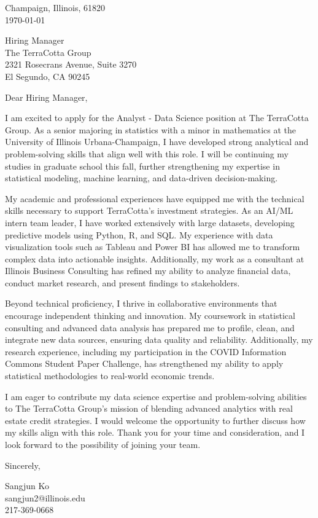 \documentclass[11pt]{article}
\begin{document}
\noindent
Champaign, Illinois, 61820 \\
\today
\vspace{2em}

\noindent
Hiring Manager \\
The TerraCotta Group \\
2321 Rosecrans Avenue, Suite 3270 \\
El Segundo, CA 90245 \\

\vspace{1.5em}

Dear Hiring Manager,

I am excited to apply for the Analyst - Data Science position at The TerraCotta Group. As a senior majoring in statistics with a minor in mathematics at the University of Illinois Urbana-Champaign, I have developed strong analytical and problem-solving skills that align well with this role. I will be continuing my studies in graduate school this fall, further strengthening my expertise in statistical modeling, machine learning, and data-driven decision-making.

My academic and professional experiences have equipped me with the technical skills necessary to support TerraCotta’s investment strategies. As an AI/ML intern team leader, I have worked extensively with large datasets, developing predictive models using Python, R, and SQL. My experience with data visualization tools such as Tableau and Power BI has allowed me to transform complex data into actionable insights. Additionally, my work as a consultant at Illinois Business Consulting has refined my ability to analyze financial data, conduct market research, and present findings to stakeholders.

Beyond technical proficiency, I thrive in collaborative environments that encourage independent thinking and innovation. My coursework in statistical consulting and advanced data analysis has prepared me to profile, clean, and integrate new data sources, ensuring data quality and reliability. Additionally, my research experience, including my participation in the COVID Information Commons Student Paper Challenge, has strengthened my ability to apply statistical methodologies to real-world economic trends.

I am eager to contribute my data science expertise and problem-solving abilities to The TerraCotta Group’s mission of blending advanced analytics with real estate credit strategies. I would welcome the opportunity to further discuss how my skills align with this role. Thank you for your time and consideration, and I look forward to the possibility of joining your team.

\vspace{1em}

Sincerely,

\vspace{2em}

\noindent
Sangjun Ko\\
sangjun2@illinois.edu\\
217-369-0668
\end{document}
